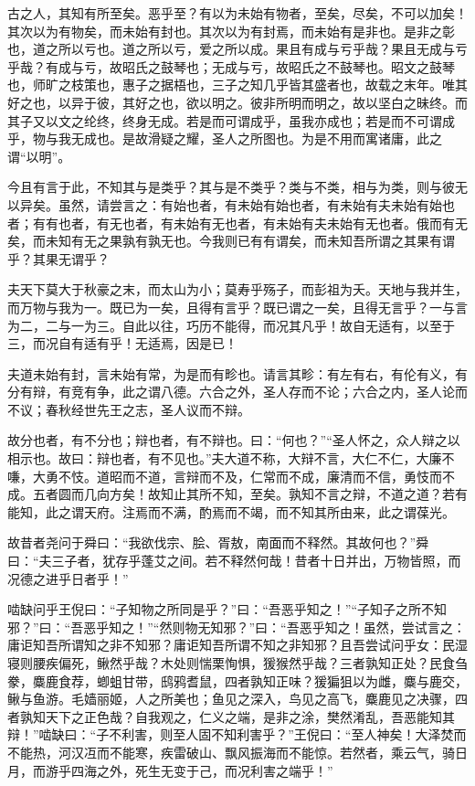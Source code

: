 \documentclass[12pt,UTF8]{ctexbook}
\begin{document}
古之人，其知有所至矣。恶乎至？有以为未始有物者，至矣，尽矣，不可以加矣！其次以为有物矣，而未始有封也。其次以为有封焉，而未始有是非也。是非之彰也，道之所以亏也。道之所以亏，爱之所以成。果且有成与亏乎哉？果且无成与亏乎哉？有成与亏，故昭氏之鼓琴也；无成与亏，故昭氏之不鼓琴也。昭文之鼓琴也，师旷之枝策也，惠子之据梧也，三子之知几乎皆其盛者也，故载之末年。唯其好之也，以异于彼，其好之也，欲以明之。彼非所明而明之，故以坚白之昧终。而其子又以文之纶终，终身无成。若是而可谓成乎，虽我亦成也；若是而不可谓成乎，物与我无成也。是故滑疑之耀，圣人之所图也。为是不用而寓诸庸，此之谓“以明”。

今且有言于此，不知其与是类乎？其与是不类乎？类与不类，相与为类，则与彼无以异矣。虽然，请尝言之：有始也者，有未始有始也者，有未始有夫未始有始也者；有有也者，有无也者，有未始有无也者，有未始有夫未始有无也者。俄而有无矣，而未知有无之果孰有孰无也。今我则已有有谓矣，而未知吾所谓之其果有谓乎？其果无谓乎？

夫天下莫大于秋豪之末，而太山为小；莫寿乎殇子，而彭祖为夭。天地与我并生，而万物与我为一。既已为一矣，且得有言乎？既已谓之一矣，且得无言乎？一与言为二，二与一为三。自此以往，巧历不能得，而况其凡乎！故自无适有，以至于三，而况自有适有乎！无适焉，因是已！

夫道未始有封，言未始有常，为是而有畛也。请言其畛：有左有右，有伦有义，有分有辩，有竞有争，此之谓八德。六合之外，圣人存而不论；六合之内，圣人论而不议；春秋经世先王之志，圣人议而不辩。

故分也者，有不分也；辩也者，有不辩也。曰：“何也？”“圣人怀之，众人辩之以相示也。故曰：辩也者，有不见也。”夫大道不称，大辩不言，大仁不仁，大廉不嗛，大勇不忮。道昭而不道，言辩而不及，仁常而不成，廉清而不信，勇忮而不成。五者圆而几向方矣！故知止其所不知，至矣。孰知不言之辩，不道之道？若有能知，此之谓天府。注焉而不满，酌焉而不竭，而不知其所由来，此之谓葆光。

故昔者尧问于舜曰：“我欲伐宗、脍、胥敖，南面而不释然。其故何也？”舜曰：“夫三子者，犹存乎蓬艾之间。若不释然何哉！昔者十日并出，万物皆照，而况德之进乎日者乎！”

啮缺问乎王倪曰：“子知物之所同是乎？”曰：“吾恶乎知之！”“子知子之所不知邪？”曰：“吾恶乎知之！”“然则物无知邪？”曰：“吾恶乎知之！虽然，尝试言之：庸讵知吾所谓知之非不知邪？庸讵知吾所谓不知之非知邪？且吾尝试问乎女：民湿寝则腰疾偏死，鳅然乎哉？木处则惴栗恂惧，猨猴然乎哉？三者孰知正处？民食刍豢，麋鹿食荐，蝍蛆甘带，鸱鸦耆鼠，四者孰知正味？猨猵狙以为雌，麋与鹿交，鳅与鱼游。毛嫱丽姬，人之所美也；鱼见之深入，鸟见之高飞，麋鹿见之决骤，四者孰知天下之正色哉？自我观之，仁义之端，是非之涂，樊然淆乱，吾恶能知其辩！”啮缺曰：“子不利害，则至人固不知利害乎？”王倪曰：“至人神矣！大泽焚而不能热，河汉冱而不能寒，疾雷破山、飘风振海而不能惊。若然者，乘云气，骑日月，而游乎四海之外，死生无变于己，而况利害之端乎！”
\end{document}

